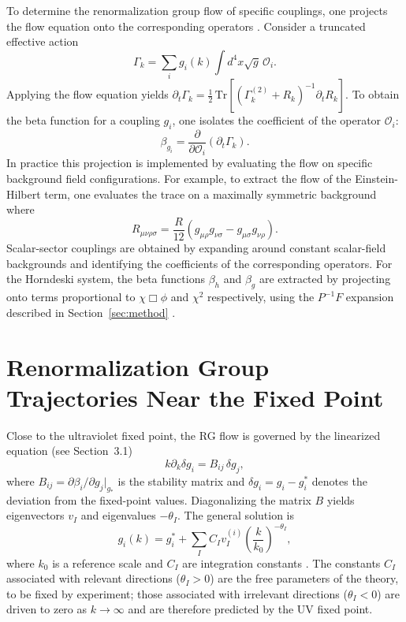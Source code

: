 \documentclass[12pt,a4paper]{article}
\begin{document}
To determine the renormalization group flow of specific couplings, one
projects the flow equation onto the corresponding operators \cite{Pawlowski2007,
Dupuis2021}. Consider a truncated effective action
\begin{equation}
\Gamma_k = \sum_i g_i(k) \int d^4x \sqrt{g}\, \mathcal{O}_i.
\end{equation}
Applying the flow equation yields $\partial_t \Gamma_k =
\tfrac{1}{2}\,\mathrm{Tr}[(\Gamma_k^{(2)} + R_k)^{-1}\partial_t R_k]$.
To obtain the beta function for a coupling $g_i$, one isolates the coefficient
of the operator $\mathcal{O}_i$:
\begin{equation}
\beta_{g_i} = \frac{\partial}{\partial \mathcal{O}_i}\left(\partial_t \Gamma_k\right).
\end{equation}
In practice this projection is implemented by evaluating the flow on specific
background field configurations. For example, to extract the flow of the
Einstein-Hilbert term, one evaluates the trace on a maximally symmetric
background where
\begin{equation}
R_{\mu\nu\rho\sigma}
= \frac{R}{12}(g_{\mu\rho}g_{\nu\sigma} - g_{\mu\sigma}g_{\nu\rho}).
\end{equation}
Scalar-sector couplings are obtained by expanding around constant
scalar-field backgrounds and identifying the coefficients of the corresponding
operators. For the Horndeski system, the beta functions $\beta_h$ and $\beta_g$
are extracted by projecting onto terms proportional to $\chi\Box\phi$ and
$\chi^2$ respectively, using the $P^{-1}F$ expansion described in
Section~\ref{sec:method} \cite{EichhornLinoWagner2023}.

\section{Renormalization Group Trajectories Near the Fixed Point}
\label{app:stability}
\label{app:rgtrajectories}

Close to the ultraviolet fixed point, the RG flow is governed by the
linearized equation (see Section~3.1)
\begin{equation}
k\partial_k \delta g_i = B_{ij}\,\delta g_j,
\end{equation}
where $B_{ij} = \partial\beta_i/\partial g_j|_{g_*}$ is the stability matrix
and $\delta g_i = g_i - g_i^*$ denotes the deviation from the fixed-point
values. Diagonalizing the matrix $B$ yields eigenvectors $v_I$ and eigenvalues
$-\theta_I$. The general solution is
\begin{equation}
g_i(k)
= g_i^*
+ \sum_I C_I v_I^{(i)}
\left(\frac{k}{k_0}\right)^{-\theta_I},
\end{equation}
where $k_0$ is a reference scale and $C_I$ are integration constants
\cite{WilsonKogut1974,ReuterSaueressig2012}. The constants $C_I$ associated
with relevant directions ($\theta_I > 0$) are the free parameters of the
theory, to be fixed by experiment; those associated with irrelevant directions
($\theta_I < 0$) are driven to zero as $k \to \infty$ and are therefore
predicted by the UV fixed point.
\end{document}

